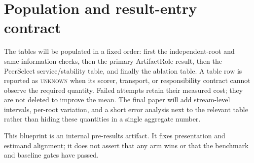 \documentclass[sigconf,anonymous]{aamas}
\newcommand{\unknown}{\textsc{unknown}}
\begin{document}
\section{Population and result-entry contract}

The tables will be populated in a fixed order: first the independent-root and
same-information checks, then the primary ArtifactRole result, then the
PeerSelect service/stability table, and finally the ablation table. A table row
is reported as \unknown{} when its scorer, transport, or responsibility contract
cannot observe the required quantity. Failed attempts retain their measured cost;
they are not deleted to improve the mean. The final paper will add stream-level
intervals, per-root variation, and a short error analysis next to the relevant
table rather than hiding these quantities in a single aggregate number.

This blueprint is an internal pre-results artifact. It fixes presentation and
estimand alignment; it does not assert that any arm wins or that the benchmark
and baseline gates have passed.
\end{document}
